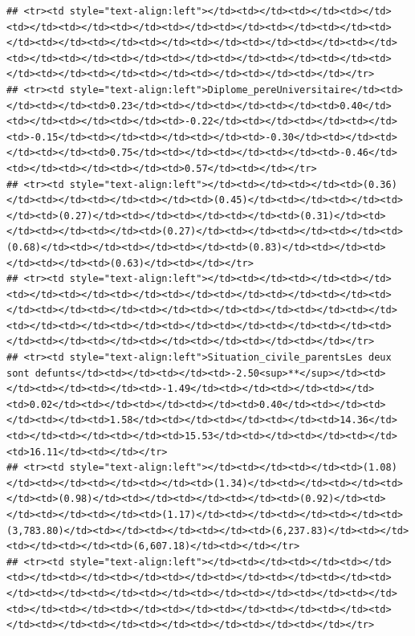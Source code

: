 \documentclass[
]{article}
\begin{document}
\begin{verbatim}
## <tr><td style="text-align:left"></td><td></td><td></td><td></td><td></td><td></td><td></td><td></td><td></td><td></td><td></td><td></td><td></td><td></td><td></td><td></td><td></td><td></td><td></td><td></td><td></td><td></td><td></td><td></td><td></td><td></td><td></td><td></td><td></td><td></td><td></td><td></td><td></td></tr>
## <tr><td style="text-align:left">Diplome_pereUniversitaire</td><td></td><td></td><td>0.23</td><td></td><td></td><td></td><td>0.40</td><td></td><td></td><td></td><td>-0.22</td><td></td><td></td><td></td><td>-0.15</td><td></td><td></td><td></td><td>-0.30</td><td></td><td></td><td></td><td>0.75</td><td></td><td></td><td></td><td>-0.46</td><td></td><td></td><td></td><td>0.57</td><td></td></tr>
## <tr><td style="text-align:left"></td><td></td><td></td><td>(0.36)</td><td></td><td></td><td></td><td>(0.45)</td><td></td><td></td><td></td><td>(0.27)</td><td></td><td></td><td></td><td>(0.31)</td><td></td><td></td><td></td><td>(0.27)</td><td></td><td></td><td></td><td>(0.68)</td><td></td><td></td><td></td><td>(0.83)</td><td></td><td></td><td></td><td>(0.63)</td><td></td></tr>
## <tr><td style="text-align:left"></td><td></td><td></td><td></td><td></td><td></td><td></td><td></td><td></td><td></td><td></td><td></td><td></td><td></td><td></td><td></td><td></td><td></td><td></td><td></td><td></td><td></td><td></td><td></td><td></td><td></td><td></td><td></td><td></td><td></td><td></td><td></td><td></td></tr>
## <tr><td style="text-align:left">Situation_civile_parentsLes deux sont defunts</td><td></td><td></td><td>-2.50<sup>**</sup></td><td></td><td></td><td></td><td>-1.49</td><td></td><td></td><td></td><td>0.02</td><td></td><td></td><td></td><td>0.40</td><td></td><td></td><td></td><td>1.58</td><td></td><td></td><td></td><td>14.36</td><td></td><td></td><td></td><td>15.53</td><td></td><td></td><td></td><td>16.11</td><td></td></tr>
## <tr><td style="text-align:left"></td><td></td><td></td><td>(1.08)</td><td></td><td></td><td></td><td>(1.34)</td><td></td><td></td><td></td><td>(0.98)</td><td></td><td></td><td></td><td>(0.92)</td><td></td><td></td><td></td><td>(1.17)</td><td></td><td></td><td></td><td>(3,783.80)</td><td></td><td></td><td></td><td>(6,237.83)</td><td></td><td></td><td></td><td>(6,607.18)</td><td></td></tr>
## <tr><td style="text-align:left"></td><td></td><td></td><td></td><td></td><td></td><td></td><td></td><td></td><td></td><td></td><td></td><td></td><td></td><td></td><td></td><td></td><td></td><td></td><td></td><td></td><td></td><td></td><td></td><td></td><td></td><td></td><td></td><td></td><td></td><td></td><td></td><td></td></tr>

\end{verbatim}
\end{document}
